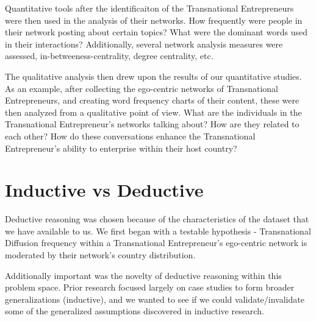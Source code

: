 Quantitative tools after the identificaiton of the Transnational
Entrepreneurs were then used in the analysis of their networks. How
frequently were people in their network posting about certain topics?
What were the dominant words used in their interactions? Additionally,
several network analysis measures were assessed, in-betweeness-centrality,
degree centrality, etc.

The qualitative analysis then drew upon the results of our
quantitative studies. As an example, after collecting the ego-centric
networks of Transnational Entrepreneurs, and creating word frequency
charts of their content, these were then analyzed from a qualitative
point of view. What are the individuals in the Transnational
Entrepreneur's networks talking about? How are they related to each
other? How do these conversations enhance the Transnational
Entrepreneur's ability to enterprise within their host country?

\section{Inductive vs Deductive}
Deductive reasoning was chosen because of the characteristics of the
dataset that we have available to us. We first began with a testable
hypothesis - Transnational Diffusion frequency within a Transnational
Entrepreneur's ego-centric network is moderated by their network's
country distribution.

Additionally important was the novelty of deductive reasoning within
this problem space. Prior research focused largely on case studies to
form broader generalizations (inductive), and we wanted to see if we
could validate/invalidate some of the generalized assumptions
discovered in inductive research.
